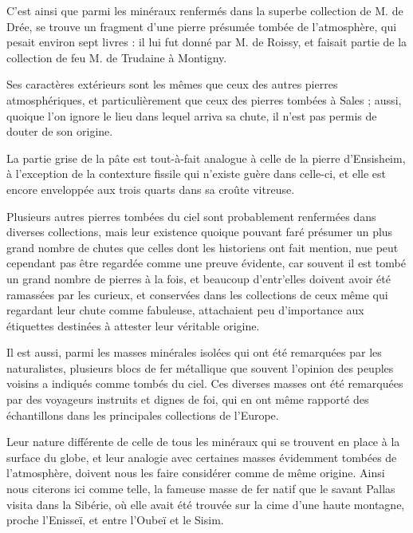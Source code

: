 \documentclass[a4paper, 12pt, oneside, french]{article}
\begin{document}
C'est ainsi que parmi les minéraux renfermés dans la superbe collection de M. de Drée, se trouve un fragment d'une pierre présumée tombée de l'atmosphère, qui pesait environ sept livres : il lui fut donné par M. de Roissy, et faisait partie de la collection de feu M. de Trudaine à Montigny.

Ses caractères extérieurs sont les mêmes que ceux des autres pierres atmosphériques, et particulièrement que ceux des pierres tombées à Sales ; aussi, quoique l'on ignore le lieu dans lequel arriva sa chute, il n'est pas permis de douter de son origine.

La partie grise de la pâte est tout-à-fait analogue à celle de la pierre d'Ensisheim, à l'exception de la contexture fissile qui n'existe guère dans celle-ci, et elle est encore enveloppée aux trois quarts dans sa croûte vitreuse.

Plusieurs autres pierres tombées du ciel sont probablement renfermées dans diverses collections, mais leur existence quoique pouvant faré présumer un plus grand nombre de chutes que celles dont les historiens ont fait mention, nue peut cependant pas être regardée comme une preuve évidente, car souvent il est tombé un grand nombre de pierres à la fois, et beaucoup d'entr'elles doivent avoir été ramassées par les curieux, et conservées dans les collections de ceux même qui regardant leur chute comme fabuleuse, attachaient peu d'importance aux étiquettes destinées à attester leur véritable origine.

Il est aussi, parmi les masses minérales isolées qui ont été remarquées par les naturalistes, plusieurs blocs de fer métallique que souvent l'opinion des peuples voisins a indiqués comme tombés du ciel. Ces diverses masses ont été remarquées par des voyageurs instruits et dignes de foi, qui en ont même rapporté des échantillons dans les principales collections de l'Europe.

Leur nature différente de celle de tous les minéraux qui se trouvent en place à la surface du globe, et leur analogie avec certaines masses évidemment tombées de l'atmosphère, doivent nous les faire considérer comme de même origine. Ainsi nous citerons ici comme telle, la fameuse masse de fer natif que le savant Pallas visita dans la Sibérie, où elle avait été trouvée sur la cime d'une haute montagne, proche l'Enisseï, et entre l'Oubeï et le Sisim.
\end{document}

